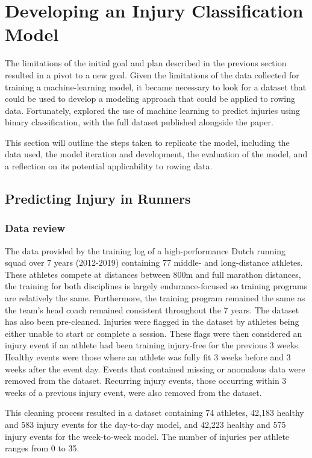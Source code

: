 \section{Developing an Injury Classification Model}
The limitations of the initial goal and plan described in the previous section resulted in a pivot to a new goal. Given the limitations of the data collected for training a machine-learning model, it became necessary to look for a dataset that could be used to develop a modeling approach that could be applied to rowing data. Fortunately, \textcite{Lovdal2021} explored the use of machine learning to predict injuries using binary classification, with the full dataset published alongside the paper. 

This section will outline the steps taken to replicate the model, including the data used, the model iteration and development, the evaluation of the model, and a reflection on its potential applicability to rowing data.

\subsection{Predicting Injury in Runners}
\subsubsection{Data review}
The data provided by \textcite{Lovdal2021} the training log of a high-performance Dutch running squad over 7 years (2012-2019) containing 77 middle- and long-distance athletes. These athletes compete at distances between 800m and full marathon distances, the training for both disciplines is largely endurance-focused so training programs are relatively the same. Furthermore, the training program remained the same as the team's head coach remained consistent throughout the 7 years. The dataset has also been pre-cleaned. Injuries were flagged in the dataset by athletes being either unable to start or complete a session. These flags were then considered an injury event if an athlete had been training injury-free for the previous 3 weeks. Healthy events were those where an athlete was fully fit 3 weeks before and 3 weeks after the event day. Events that contained missing or anomalous data were removed from the dataset. Recurring injury events, those occurring within 3 weeks of a previous injury event, were also removed from the dataset.

This cleaning process resulted in a dataset containing 74 athletes, 42,183 healthy and 583 injury events for the day-to-day model, and 42,223 healthy and 575 injury events for the week-to-week model. The number of injuries per athlete ranges from 0 to 35.

